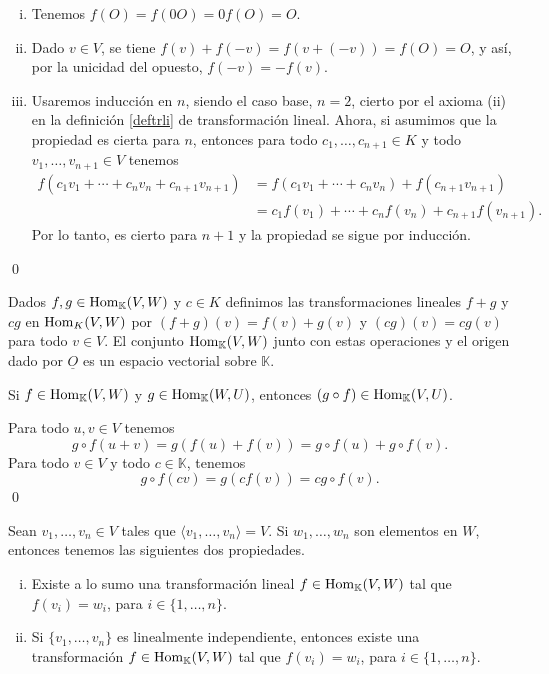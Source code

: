 \dem 
\begin{enumerate}[(i)]
\item Tenemos $f(O)=f(0O)=0f(O)=O$.
\item Dado $v\in V$, se tiene $f(v)+f(-v)=f\left(v+(-v)\right)=f(O)=O$, y as\'i, por la unicidad del opuesto, $f(-v)=-f(v)$.
\item Usaremos inducci\'on en $n$, siendo el caso base, $n=2$, cierto por el axioma (ii) en la definici\'on \ref{deftrli} de transformaci\'on lineal. Ahora, si asumimos que la propiedad es cierta para $n$, entonces para todo $c_1,\ldots,c_{n+1}\in K$ y todo $v_1,\ldots,v_{n+1}\in V$ tenemos
\begin{align*}
f(c_1v_1+\cdots+c_nv_n+c_{n+1}v_{n+1})& = f(c_1v_1+\cdots+c_nv_n)+f(c_{n+1}v_{n+1})\\
  & = c_1f(v_1)+\cdots+c_nf(v_n)+c_{n+1}f(v_{n+1}).
\end{align*}
Por lo tanto, es cierto para $n+1$ y la propiedad se sigue por inducci\'on.
\end{enumerate}\qed

\begin{obs}
Dados $f,g\in\operatorname{Hom}_{\mathbb{K}}(V,W)$ y $c\in K$ definimos las transformaciones lineales $f+g$ y $cg$ en $\operatorname{Hom}_K(V,W)$ por $(f+g)(v)=f(v)+g(v)$ y $(cg)(v) = cg(v)$ para todo $v\in V$. El conjunto $\operatorname{Hom}_{\mathbb{K}}(V,W)$ junto con estas operaciones y el origen dado por $\underline{O}$ es un espacio vectorial sobre $\mathbb{K}$.
\end{obs}

\begin{prop}\label{compeslineal}
Si $f\in\operatorname{Hom}_{\mathbb{K}}(V,W)$ y $g\in\operatorname{Hom}_{\mathbb{K}}(W,U)$, entonces $(g\circ f)\in\operatorname{Hom}_{\mathbb{K}}(V,U)$.
\end{prop}

\dem Para todo $u,v\in V$ tenemos
\[
g\circ f(u+v)=g\left( f(u)+f(v)\right)= g\circ f(u)+g\circ f(v).
\]
Para todo $v\in V$ y todo $c\in \mathbb{K}$, tenemos
\[
g\circ f(cv)=g\left( c f(v)\right)=cg\circ f(v).
\]
\qed

\begin{prop}\label{unitrlin}
Sean $v_1,\ldots,v_n\in V$ tales que $\langle v_1,\ldots,v_n\rangle=V$. Si $w_1,\ldots,w_n$ son elementos en $W$, entonces tenemos las siguientes dos propiedades.
\begin{enumerate}[(i)]
\item Existe a lo sumo una transformaci\'on lineal $f\in\operatorname{Hom}_{\mathbb{K}}(V,W)$ tal que $f(v_i)=w_i$, para $i\in\{1,\ldots,n\}$.
\item Si $\{v_1,\ldots,v_n\}$ es linealmente independiente, entonces existe una transformaci\'on $f\in\operatorname{Hom}_{\mathbb{K}}(V,W)$ tal que $f(v_i)=w_i$, para $i\in\{1,\ldots,n\}$.
\end{enumerate}
\end{prop}

